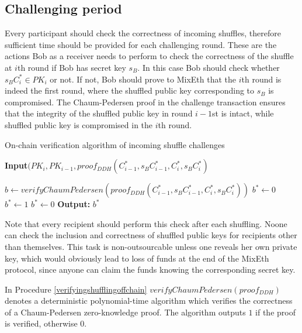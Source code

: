 \documentclass[a4paper]{article}
\theoremstyle{definition}
\begin{document}
\subsection{Challenging period}
Every participant should check the correctness of incoming shuffles, therefore sufficient time should be provided for each challenging round. These are the actions Bob as a receiver needs to perform to check the correctness of the shuffle at $i$th round if Bob has secret key $s_{B}$. In this case Bob should check whether $s_{B}C^{*}_{i} \in PK_{i}$ or not. If not, Bob should prove to MixEth that the $i$th round is indeed the first round, where the shuffled public key corresponding to $s_{B}$ is compromised. The Chaum-Pedersen proof in the challenge transaction ensures that the integrity of the shuffled public key in round $i-1$st is intact, while shuffled public key is compromised in the $i$th round.   

\begin{algorithm}
	\caption{On-chain verification algorithm of incoming shuffle challenges}\label{verifyingshufflingoffchain}
	\hspace*{\algorithmicindent} \textbf{Input}$(PK_{i}, PK_{i-1}, proof_{DDH}(C^{*}_{i-1},s_{B}C^{*}_{i-1},C^{*}_{i},s_{B}C^{*}_{i})$ \\
	\begin{algorithmic}[1]
		\State $b\leftarrow verifyChaumPedersen(proof_{DDH}(C^{*}_{i-1},s_{B}C^{*}_{i-1}, C^{*}_{i},s_{B}C^{*}_{i}))$ 
		\State $b^*\leftarrow0$
		\State $b^*\gets 1$
		\Else
		\State $b^*\gets 0$
		\EndIf
		\hspace*{\algorithmicindent} \textbf{Output:} $b^{*}$ 
	\end{algorithmic}   
\end{algorithm}
Note that every recipient should perform this check after each shuffling. Noone can check the inclusion and correctness of shuffled public keys for recipients other than themselves. This task is non-outsourcable unless one reveals her own private key, which would obviously lead to loss of funds at the end of the MixEth protocol, since anyone can claim the funds knowing the corresponding secret key.

In Procedure \ref{verifyingshufflingoffchain} $verifyChaumPedersen(proof_{DDH})$ denotes a deterministic polynomial-time algorithm which verifies the correctness of a Chaum-Pedersen zero-knowledge proof. The algorithm outputs $1$ if the proof is verified, otherwise $0$.   
\end{document}

